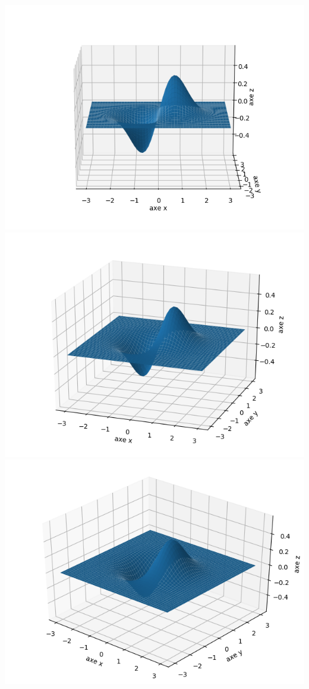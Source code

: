 \begin{exemple}{}{}
	\begin{center}
		\includegraphics[scale=\myscale,scale=0.5]{figures/fonctions-surface-1a}
		\includegraphics[scale=\myscale,scale=0.5]{figures/fonctions-surface-1b}
		\includegraphics[scale=\myscale,scale=0.5]{figures/fonctions-surface-1c}

\end{center}
\end{exemple}
